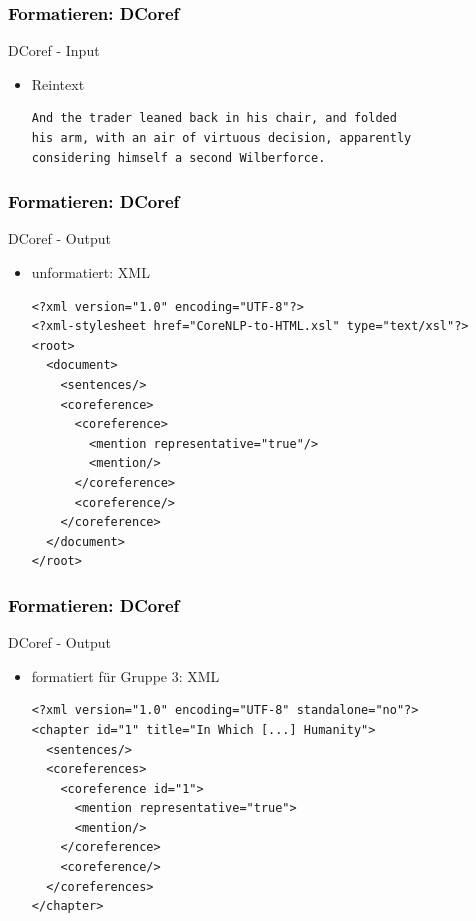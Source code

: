 \documentclass[xcolor=dvipsnames]{beamer}
\begin{document}

\begin{frame}[fragile]\frametitle{\textcolor{black}{Formatieren: DCoref}}

\begin{block}{DCoref - Input}
\begin{itemize}
\item Reintext
\begin{verbatim}
And the trader leaned back in his chair, and folded  
his arm, with an air of virtuous decision, apparently
considering himself a second Wilberforce. 
\end{verbatim}
\end{itemize}
\end{block}



\end{frame}


\begin{frame}[fragile]\frametitle{\textcolor{black}{Formatieren: DCoref}}

\begin{block}{DCoref - Output}
\begin{itemize}
\item unformatiert: XML
\begin{small}\begin{verbatim}
<?xml version="1.0" encoding="UTF-8"?>
<?xml-stylesheet href="CoreNLP-to-HTML.xsl" type="text/xsl"?>
<root>
  <document>
    <sentences/>
    <coreference>
      <coreference>
        <mention representative="true"/>
        <mention/>
      </coreference>
      <coreference/>
    </coreference>
  </document>
</root>
\end{verbatim}
\end{small}
\end{itemize}
\end{block}

\end{frame}


\begin{frame}[fragile]\frametitle{\textcolor{black}{Formatieren: DCoref}}

\begin{block}{DCoref - Output}
\begin{itemize}
\item formatiert für Gruppe 3: XML
\begin{small}\begin{verbatim}
<?xml version="1.0" encoding="UTF-8" standalone="no"?>
<chapter id="1" title="In Which [...] Humanity">
  <sentences/>
  <coreferences>
    <coreference id="1">
      <mention representative="true">
      <mention/>
    </coreference>
    <coreference/>
  </coreferences>
</chapter>
\end{verbatim}
\end{small}
\end{itemize}
\end{block}

\end{frame}
\end{document}
